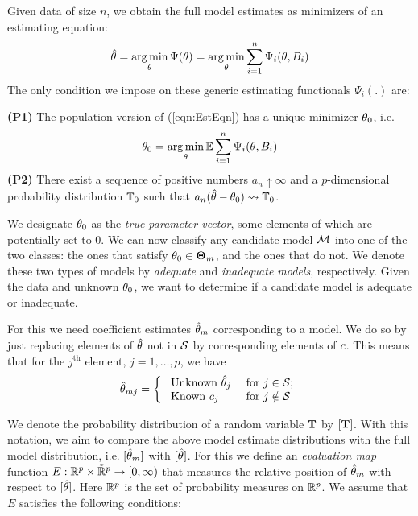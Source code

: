 Given data of size $n$, we obtain the full model estimates as minimizers of an estimating equation:
%
\begin{align}\label{eqn:EstEqn}
\hat {{\theta}} = \operatorname*{arg\,min}_{ {\theta}} \Psi ({\theta}) = \operatorname*{arg\,min}_{ {\theta} } \sum_{i=1}^n \Psi_i ({\theta}, B_i)
\end{align}
%
The only condition we impose on these generic estimating functionals $\Psi_i(.)$ are:

\noindent\textbf{(P1)} The population version of (\ref{eqn:EstEqn}) has a unique minimizer ${\theta}_0$, i.e.
%
\begin{align*}
{\theta}_0 = \operatorname*{arg\,min}_{ {\theta} } \mathbb{E} \sum_{i=1}^n \Psi_i ({\theta}, B_i)
\end{align*}
%
\noindent\textbf{(P2)} There exist a sequence of positive numbers $a_n \uparrow \infty$ and a $p$-dimensional probability distribution $\mathbb{T}_0$ such that $a_n (\hat {{\theta}} - {\theta}_0) \leadsto \mathbb{T}_0$.
%

We designate ${\theta}_0$ as the {\it true parameter vector}, some elements of which are potentially set to 0. We can now classify any candidate model $\mathcal{M}$ into one of the two classes: the ones that satisfy ${\theta}_0 \in {\boldsymbol{\Theta}}_m$, and the ones that do not. We denote these two types of models by \textit{adequate} and \textit{inadequate models}, respectively. Given the data and unknown ${\theta}_0$, we want to determine if a candidate model is adequate or inadequate.

For this we need coefficient estimates $\hat {{\theta}}_m$ corresponding to a model. We do so by just replacing elements of $\hat {{\theta}}$ not in $\mathcal{S}$ by corresponding elements of ${c}$. This means that for the $j^\text{th}$ element, $j = 1, \ldots, p$, we have
%
$$
\hat \theta_{m j} = \left\{ \begin{array}{ll}
\text{ Unknown } \hat \theta_{j} & \text{ for } 
			j \in \mathcal{S}; \\
\text{ Known } c_{j} & \text{ for } j \notin \mathcal{S}
\end{array}
\right.
$$
%

We denote the probability distribution of a random variable ${\mathbf{T}}$ by $[{\mathbf{T}}]$. With this notation, we aim to compare the above model estimate distributions with the full model distribution, i.e. $[\hat {{\theta}}_m]$ with  $[\hat{{\theta}}]$. For this we define an \textit{evaluation map} function $E: \mathbb{R}^p \times \tilde {\mathbb{R}}^p \rightarrow [0, \infty)$ that measures the relative position of $\hat {{\theta}}_m$ with respect to $[\hat {{\theta}}]$. Here $\tilde {\mathbb{R}}^p$ is the set of probability measures on $\mathbb{R}^p$. We assume that $E$ satisfies the following conditions:


